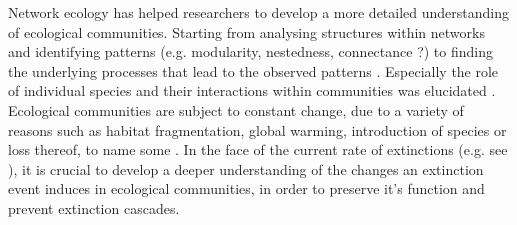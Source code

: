 \documentclass[12pt,a4paper]{article}
\begin{document}

%
Network ecology has helped researchers to develop a more detailed understanding of ecological communities. Starting from analysing structures within networks and identifying patterns (e.g. modularity, nestedness, connectance ?) \parencite{Jordano1987, Dunne2002 } %
to finding the underlying processes that lead to the observed patterns \parencite{Rezende2007, Vazquez2009, Thebault2010}. Especially the role of individual species and their interactions within communities was elucidated \parencite{Waser1996, Lau2017}.
Ecological communities are subject to constant change, due to a variety of reasons such as habitat fragmentation, global warming, introduction of species or loss thereof, to name some \parencite{}. In the face of the current rate of extinctions (e.g. see \cite{IPBES}), it is crucial to develop a deeper understanding of the changes an extinction event induces in ecological communities, in order to preserve it's function and prevent extinction cascades. 

	


\end{document}
